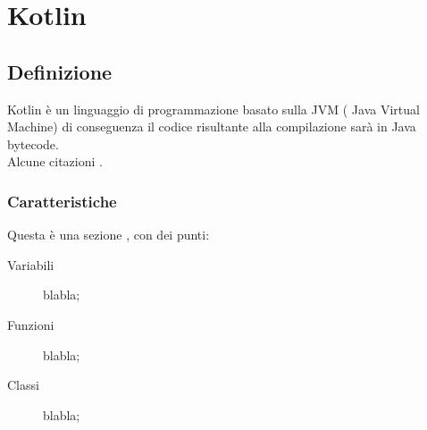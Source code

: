 \chapter{Kotlin}                %
\lhead[\fancyplain{}{\bfseries\thepage}]{\fancyplain{}{\bfseries\rightmark}}
\section{Definizione}                 %
Kotlin è un linguaggio di programmazione basato sulla JVM ( Java Virtual Machine) di conseguenza il codice risultante alla compilazione sar\`a in Java bytecode.\\
Alcune citazioni \cite{K1,K2}.\\



\subsection{Caratteristiche}
Questa \`e una sezione \cite{K1}, con dei punti:
\begin{description}                     %
  \item[Variabili] blabla;
  \item[Funzioni] blabla;
  \item[Classi] blabla;

\end{description}

\clearpage{\pagestyle{empty}\cleardoublepage}
